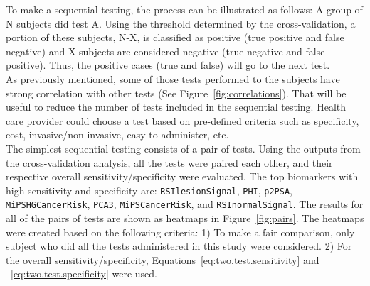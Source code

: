 \documentclass[]{article}
\begin{document}
\noindent To make a sequential testing, the process can be illustrated as follows:  
A group of N subjects did test A.  Using the threshold determined by the cross-validation, 
a portion of these subjects, N-X, is classified as positive (true positive and false negative) 
and X subjects are considered negative (true negative and false positive). 
Thus, the positive cases (true and false) will go to the next test. \\

\noindent As previously mentioned, some of those tests performed to the subjects have strong correlation 
with other tests (See Figure~\ref{fig:correlations}). That will be useful to reduce the number of tests 
included in the sequential testing. Health care provider could choose a test based on pre-defined criteria such 
as specificity, cost, invasive/non-invasive, easy to administer, etc. \\

\noindent The simplest sequential testing consists of a pair of tests. Using the outputs from the cross-validation
analysis, all the tests were paired each other, and their respective overall sensitivity/specificity were 
evaluated. The top biomarkers with high sensitivity and specificity are: {\verb|RSIlesionSignal|}, {\verb|PHI|}, 
{\verb|p2PSA|}, {\verb|MiPSHGCancerRisk|}, {\verb|PCA3|}, {\verb|MiPSCancerRisk|}, and {\verb|RSInormalSignal|}. 
The results for all of the pairs of tests are shown as heatmaps in Figure~\ref{fig:pairs}. The heatmaps were 
created based on the following criteria: 1) To make a fair comparison, only subject who did all the tests 
administered in this study were considered. 2) For the overall sensitivity/specificity, 
Equations~\ref{eq:two.test.sensitivity} and ~\ref{eq:two.test.specificity} were used. \\
\end{document}
